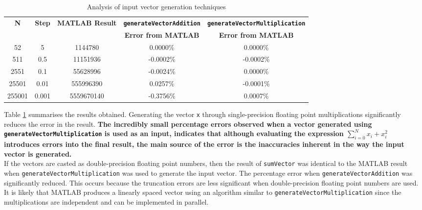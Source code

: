 \documentclass{article}
\begin{document}
\begin{table}[H]
  \centering
    \begin{tabular}{|c|c|c|c|c|}
    \hline
    \multirow{2}[4]{*}{\textbf{N}} & \multirow{2}[4]{*}{\textbf{Step}} & \multirow{2}[4]{*}{\textbf{MATLAB Result}} & \textbf{{\tt generateVectorAddition}} & \textbf{{\tt generateVectorMultiplication}} \\
\cline{4-5}          &       &       & \textbf{Error from MATLAB} & \textbf{Error from MATLAB} \\
    \hline
    52    & 5     & 1144780 & 0.0000\% & 0.0000\% \\
    \hline
    511   & 0.5   & 11151936 & -0.0002\% & -0.0002\% \\
    \hline
    2551  & 0.1   & 55628996 & -0.0024\% & 0.0000\% \\
    \hline
    25501 & 0.01  & 555996390 & 0.0257\% & -0.0001\% \\
    \hline
    255001 & 0.001 & 5559670140 & -0.3756\% & 0.0007\% \\
    \hline
    \end{tabular}%
  \caption{Analysis of input vector generation techniques}
  \label{tab:generate_vector_performance}%
\end{table}%


Table \ref{tab:generate_vector_performance} summarises the results obtained. Generating the vector {\tt x} through single-precision floating point multiplications significantly reduces the error in the result. \textbf{The incredibly small percentage errors observed when a vector generated using {\tt generateVectorMultiplication} is used as an input, indicates that although evaluating the expression $\sum_{i=0}^{N}x_{i}+x_{i}^{2}$ introduces errors into the final result, the main source of the error is the inaccuracies inherent in the way the input vector is generated.}\\  

If the vectors are casted as double-precision floating point numbers, then the result of {\tt sumVector} was identical to the MATLAB result when {\tt generateVectorMultiplication} was used to generate the input vector. The percentage error when {\tt generateVectorAddition} was significantly reduced. This occurs because the truncation errors are less significant when double-precision floating point numbers are used. It is likely that MATLAB produces a linearly spaced vector using an algorithm similar to {\tt generateVectorMultiplication} since the multiplications are independent and can be implemented in parallel.\\
\end{document}
